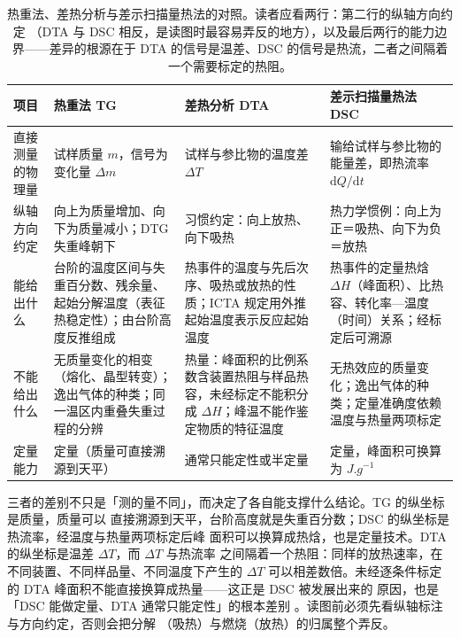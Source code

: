 \begin{table}[tbp]
\centering
\caption{热重法、差热分析与差示扫描量热法的对照。读者应看两行：第二行的纵轴方向约定
（DTA 与 DSC 相反，是读图时最容易弄反的地方），以及最后两行的能力边界——差异的根源在于
DTA 的信号是温差、DSC 的信号是热流，二者之间隔着一个需要标定的热阻。}
\label{tab:ch03-three}
{\srcsize
\begin{tabularx}{\textwidth}{@{}lXXX@{}}
\toprule
项目 & 热重法 TG & 差热分析 DTA & 差示扫描量热法 DSC \\
\midrule
直接测量的物理量 & 试样质量 $m$，信号为变化量 $\Delta m$ & 试样与参比物的温度差 $\Delta T$ & 输给试样与参比物的能量差，即热流率 $\mathrm{d}Q/\mathrm{d}t$ \\
纵轴方向约定 & 向上为质量增加、向下为质量减小；DTG 失重峰朝下 & 习惯约定：向上放热、向下吸热 & 热力学惯例：向上为正＝吸热、向下为负＝放热 \\
能给出什么 & 台阶的温度区间与失重百分数、残余量、起始分解温度（表征热稳定性）；由台阶高度反推组成 & 热事件的温度与先后次序、吸热或放热的性质；ICTA 规定用外推起始温度表示反应起始温度 & 热事件的定量热焓 $\Delta H$（峰面积）、比热容、转化率—温度（时间）关系；经标定后可溯源 \\
不能给出什么 & 无质量变化的相变（熔化、晶型转变）；逸出气体的种类；同一温区内重叠失重过程的分辨 & 热量：峰面积的比例系数含装置热阻与样品热容，未经标定不能积分成 $\Delta H$；峰温不能作鉴定物质的特征温度 & 无热效应的质量变化；逸出气体的种类；定量准确度依赖温度与热量两项标定 \\
定量能力 & 定量（质量可直接溯源到天平） & 通常只能定性或半定量 & 定量，峰面积可换算为 $\unit{J.g^{-1}}$ \\
\bottomrule
\end{tabularx}}
\end{table}

三者的差别不只是「测的量不同」，而决定了各自能支撑什么结论。TG 的纵坐标是质量，质量可以
直接溯源到天平，台阶高度就是失重百分数；DSC 的纵坐标是热流率，经温度与热量两项标定后峰
面积可以换算成热焓，也是定量技术。DTA 的纵坐标是温差 $\Delta T$，而 $\Delta T$ 与热流率
之间隔着一个热阻：同样的放热速率，在不同装置、不同样品量、不同温度下产生的 $\Delta T$
可以相差数倍。未经逐条件标定的 DTA 峰面积不能直接换算成热量——这正是 DSC 被发展出来的
原因，也是「DSC 能做定量、DTA 通常只能定性」的根本差别
。读图前必须先看纵轴标注与方向约定，否则会把分解
（吸热）与燃烧（放热）的归属整个弄反。

